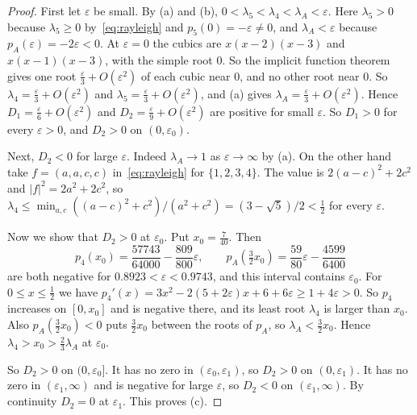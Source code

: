 \begin{proof}
First let $\varepsilon$ be small. By (a) and (b),
$0<\lambda_5<\lambda_4<\lambda_A<\varepsilon$. Here $\lambda_5>0$ because
$\lambda_5\ge0$ by~\eqref{eq:rayleigh} and $p_5(0)=-\varepsilon\ne0$, and
$\lambda_A<\varepsilon$ because $p_A(\varepsilon)=-2\varepsilon<0$. At $\varepsilon=0$ the cubics are
$x(x-2)(x-3)$ and $x(x-1)(x-3)$, with the simple root $0$. So the implicit
function theorem gives one root $\frac\varepsilon3+O(\varepsilon^2)$ of each
cubic near $0$, and no other root near $0$. So
$\lambda_4=\frac\varepsilon3+O(\varepsilon^2)$ and
$\lambda_5=\frac\varepsilon3+O(\varepsilon^2)$, and (a) gives
$\lambda_A=\frac\varepsilon3+O(\varepsilon^2)$. Hence
$D_1=\frac\varepsilon6+O(\varepsilon^2)$ and
$D_2=\frac\varepsilon9+O(\varepsilon^2)$ are positive for small
$\varepsilon$. So $D_1>0$ for every $\varepsilon>0$, and $D_2>0$ on
$(0,\varepsilon_0)$.

Next, $D_2<0$ for large $\varepsilon$. Indeed $\lambda_A\to1$ as
$\varepsilon\to\infty$ by (a). On the other hand take $f=(a,a,c,c)$
in~\eqref{eq:rayleigh} for $\{1,2,3,4\}$. The value is $2(a-c)^2+2c^2$ and
$\lvert f\rvert^2=2a^2+2c^2$, so
$\lambda_4\le\min_{a,c}((a-c)^2+c^2)/(a^2+c^2)=(3-\sqrt5)/2<\frac12$ for every
$\varepsilon$.

Now we show that $D_2>0$ at $\varepsilon_0$. Put $x_0=\frac7{40}$. Then
\[
 p_4(x_0)=\frac{57743}{64000}-\frac{809}{800}\varepsilon,\qquad
 p_A(\tfrac32x_0)=\frac{59}{80}\varepsilon-\frac{4599}{6400}
\]
are both negative for $0.8923<\varepsilon<0.9743$, and this interval contains
$\varepsilon_0$. For $0\le x\le\frac12$ we have
$p_4'(x)=3x^2-2(5+2\varepsilon)x+6+6\varepsilon\ge1+4\varepsilon>0$. So $p_4$
increases on $[0,x_0]$ and is negative there, and its least root
$\lambda_4$ is larger than $x_0$. Also $p_A(\frac32x_0)<0$ puts $\frac32x_0$
between the roots of $p_A$, so $\lambda_A<\frac32x_0$. Hence
$\lambda_4>x_0>\frac23\lambda_A$ at $\varepsilon_0$.

So $D_2>0$ on $(0,\varepsilon_0]$. It has no zero in
$(\varepsilon_0,\varepsilon_1)$, so $D_2>0$ on $(0,\varepsilon_1)$. It has no
zero in $(\varepsilon_1,\infty)$ and is negative for large $\varepsilon$, so
$D_2<0$ on $(\varepsilon_1,\infty)$. By continuity $D_2=0$ at
$\varepsilon_1$. This proves (c).


\end{proof}
